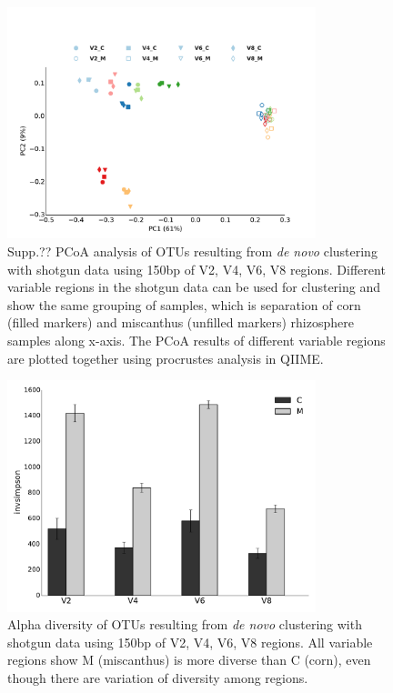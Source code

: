 \documentclass[12pt]{article}
\begin{document}
\begin{figure}[tbph!]
  \centering
  \includegraphics[width=0.8\textwidth]{figs/compare_vregion_color_1leg}

  \caption[PCoA analysis of OTUs resulting from {\em de novo}
  clustering with shotgun data using 150bp of V2, V4, V6, V8
  regions]{Supp.?? PCoA analysis of OTUs resulting from {\em de novo}
  clustering with shotgun data using 150bp of V2, V4, V6, V8
  regions. Different variable regions in the shotgun data can be used
  for clustering and show the same grouping of samples, which is
  separation of corn (filled markers) and miscanthus (unfilled
  markers) rhizosphere samples along x-axis. The PCoA results of
  different variable regions are plotted together using procrustes
  analysis in QIIME.}

  \label{fig:compare_vregion}
\end{figure}

\begin{figure}[tbph!]
  \centering
  \includegraphics[width=0.8\textwidth]{figs/compare_vregion_alpha.pdf}

  \caption[Alpha diversity of OTUs resulting from {\em de novo}
  clustering with shotgun data using 150bp of V2, V4, V6, V8
  regions]{Alpha diversity of OTUs resulting from {\em de novo}
  clustering with shotgun data using 150bp of V2, V4, V6, V8
  regions. All variable regions show M (miscanthus) is more diverse
  than C (corn), even though there are variation of diversity among
  regions.}

  \label{fig:compare_vregion_alpha}
\end{figure}
\end{document}
